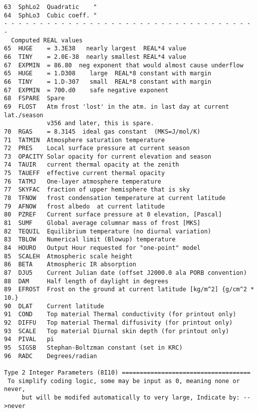\documentclass{article}
\begin{document}
\begin{verbatim}
63  SphLo2  Quadratic    "
64  SphLo3  Cubic coeff. "
- - - - - - - - - - - - - - - - - - - - - - - - - - - - - - - - - - - -
  Computed REAL values 
65  HUGE    = 3.3E38   nearly largest  REAL*4 value
66  TINY    = 2.0E-38  nearly smallest REAL*4 value
67  EXPMIN  = 86.80  neg exponent that would almost cause underflow
65  HUGE    = 1.D308    large  REAL*8 constant with margin
66  TINY    = 1.D-307   small  REAL*8 constant with margin
67  EXPMIN  = 700.d0    safe negative exponent
68  FSPARE  Spare
69  FLOST   Atm frost 'lost' in the atm. in last day at current lat./season
            v356 and later, this is spare.
70  RGAS    = 8.3145  ideal gas constant  (MKS=J/mol/K)
71  TATMIN  Atmosphere saturation temperature
72  PRES    Local surface pressure at current season
73  OPACITY Solar opacity for current elevation and season
74  TAUIR   current thermal opacity at the zenith
75  TAUEFF  effective current thermal opacity 
76  TATMJ   One-layer atmosphere temperature
77  SKYFAC  fraction of upper hemisphere that is sky
78  TFNOW   frost condensation temperature at current latitude
79  AFNOW   frost albedo  at current latitude
80  PZREF   Current surface pressure at 0 elevation, [Pascal]
81  SUMF    Global average columnar mass of frost [MKS]
82  TEQUIL  Equilibrium temperature (no diurnal variation)
83  TBLOW   Numerical limit (Blowup) temperature
84  HOURO   Output Hour requested for "one-point" model
85  SCALEH  Atmospheric scale height
86  BETA    Atmospheric IR absorption
87  DJU5    Current Julian date (offset J2000.0 ala PORB convention)
88  DAM     Half length of daylight in degrees
89  EFROST  Frost on the ground at current latitude [kg/m^2] {g/cm^2 * 10.} 
90  DLAT    Current latitude
91  COND    Top material Thermal conductivity (for printout only)
92  DIFFU   Top material Thermal diffusivity (for printout only)
93  SCALE   Top material Diurnal skin depth (for printout only)
94  PIVAL   pi
95  SIGSB   Stephan-Boltzman constant (set in KRC)
96  RADC    Degrees/radian

Type 2 Integer Parameters (8I10) ====================================
 To simplify coding logic, some may be input as 0, meaning none or never,
     but will be modifed automatically to very large, Indicate by: -->never 


\end{verbatim}
\end{document}
